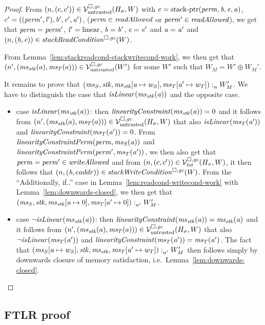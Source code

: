 \begin{proof}
  From $\npair{(c,c')}\in\lrv(H_\sigma,W)$ with $c = \stkptr{\perm,\baddr,\eaddr,\aaddr}$, $c' = ((\perm',\lin'),\baddr',\eaddr',\aaddr')$, ($\perm \in \readAllowed{}$ or $\perm' \in \readAllowed{}$), we get that $\perm = \perm'$, $\lin' = \linear$, $\baddr = \baddr'$, $\eaddr = \eaddr'$ and $\aaddr = \aaddr'$ and $\npair{(\baddr,\eaddr)} \in \stackReadCond{W}$.

  From Lemma~\ref{lem:stackreadcond-stackwritecond-work}, we then get that $\npair[n']{(\ms_\stk(a),\ms_T(a))}\in\lrv(W')$ for some $W'$ such that $W_M = W' \oplus W_M'$.


  It remains to prove that $\memSat{(\ms_S,\stk,\ms_\stk\update{\aaddr}{w_S},\ms_T\update{\aaddr'}{w_T})}{W_M'}$.
  We have to distinguish the case that $\isLinear{\ms_\stk(\aaddr)}$ and the opposite case.
  \begin{itemize}
  \item case $\isLinear{\ms_\stk(\aaddr)}$: then $\linCons{\ms_\stk(\aaddr)} = 0$ and it follows from $\npair[n']{(\ms_\stk(a),\ms_T(a))}\in\lrv(H_\sigma,W)$ that also $\isLinear{\ms_T(\aaddr')}$  and $\linCons{\ms_T(\aaddr')} = 0$.
    From $\linConsPerm{\perm}{\ms_S(\aaddr)}$ and $\linConsPerm{\perm'}{\ms_T(\aaddr')}$, we then also get that $\perm = \perm' \in \writeAllowed{}$ and from $\npair{(c,c')}\in\lrvg{\trust}(H_\sigma,W)$, it then follows that $\npair{(\baddr,eaddr)} \in \stackWriteCond{W}$.
    From the ``Additionally, if..'' case in Lemma~\ref{lem:readcond-writecond-work} with Lemma~\ref{lem:downwards-closed}, we then get that $\memSat[n']{(\ms_S,\stk,\ms_\stk\update{\aaddr}{0},\ms_T\update{\aaddr'}{0})}{W_M'}$.

  \item case $\neg\isLinear{\ms_\stk(\aaddr)}$: then $\linCons{\ms_\stk(\aaddr)} = \ms_\stk(\aaddr)$ and it follows from $\npair[n']{(\ms_\stk(a),\ms_T(a))}\in\lrv(H_\sigma,W)$ that also $\neg\isLinear{\ms_T(\aaddr')}$ 
    and $\linCons{\ms_T(\aaddr')} = \ms_T(\aaddr')$.
    The fact that $\memSat[n']{(\ms_S\update{\aaddr}{w_S},\stk,\ms_\stk,\ms_T\update{\aaddr'}{w_T})}{W_M'}$ then follows simply by downwards closure of memory satisfaction, i.e.\ Lemma~\ref{lem:downwards-closed}.
  \end{itemize}
\end{proof}

\subsection{FTLR proof}

